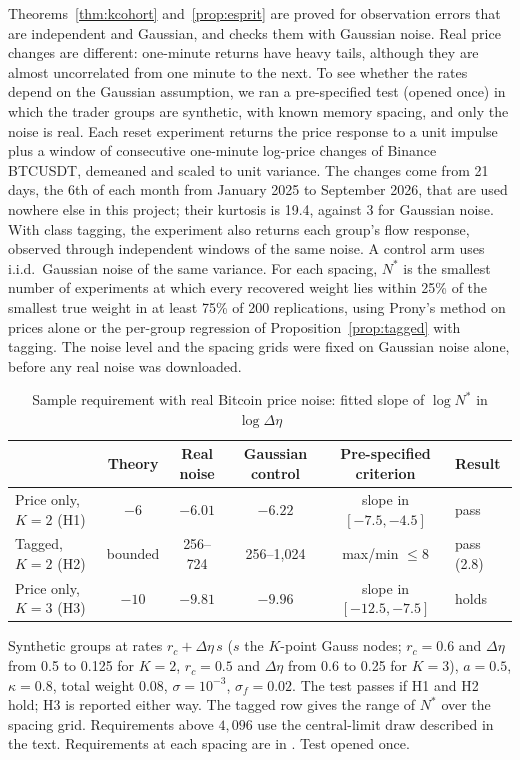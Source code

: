 \documentclass[12pt]{article}
\theoremstyle{definition}
\theoremstyle{remark}
\begin{document}
Theorems~\ref{thm:kcohort} and~\ref{prop:esprit} are proved for observation errors that are independent and Gaussian, and \citet{niroula2026a} checks them with Gaussian noise. Real price changes are different: one-minute returns have heavy tails, although they are almost uncorrelated from one minute to the next. To see whether the rates depend on the Gaussian assumption, we ran a pre-specified test (opened once) in which the trader groups are synthetic, with known memory spacing, and only the noise is real. Each reset experiment returns the price response to a unit impulse plus a window of consecutive one-minute log-price changes of Binance BTCUSDT, demeaned and scaled to unit variance. The changes come from 21 days, the 6th of each month from January 2025 to September 2026, that are used nowhere else in this project; their kurtosis is 19.4, against 3 for Gaussian noise. With class tagging, the experiment also returns each group's flow response, observed through independent windows of the same noise. A control arm uses i.i.d.\ Gaussian noise of the same variance. For each spacing, $N^*$ is the smallest number of experiments at which every recovered weight lies within 25\% of the smallest true weight in at least 75\% of 200 replications, using Prony's method on prices alone or the per-group regression of Proposition~\ref{prop:tagged} with tagging. The noise level and the spacing grids were fixed on Gaussian noise alone, before any real noise was downloaded.

\begin{table}[t]\centering\small
\begin{threeparttable}
\caption{Sample requirement with real Bitcoin price noise: fitted slope of $\log N^*$ in $\log\Delta\eta$}\label{tab:injection}
\begin{tabular}{lccccl}
\toprule
 & Theory & Real noise & Gaussian control & Pre-specified criterion & Result\\
\midrule
Price only, $K=2$ (H1) & $-6$ & $-6.01$ & $-6.22$ & slope in $[-7.5,-4.5]$ & pass\\
Tagged, $K=2$ (H2) & bounded & 256--724 & 256--1{,}024 & max/min $\le8$ & pass (2.8)\\
Price only, $K=3$ (H3) & $-10$ & $-9.81$ & $-9.96$ & slope in $[-12.5,-7.5]$ & holds\\
\bottomrule
\end{tabular}
\begin{tablenotes}\footnotesize\item Synthetic groups at rates $r_c+\Delta\eta\,s$ ($s$ the $K$-point Gauss nodes; $r_c=0.6$ and $\Delta\eta$ from 0.5 to 0.125 for $K=2$, $r_c=0.5$ and $\Delta\eta$ from 0.6 to 0.25 for $K=3$), $a=0.5$, $\kappa=0.8$, total weight 0.08, $\sigma=10^{-3}$, $\sigma_f=0.02$. The test passes if H1 and H2 hold; H3 is reported either way. The tagged row gives the range of $N^*$ over the spacing grid. Requirements above $4{,}096$ use the central-limit draw described in the text. Requirements at each spacing are in \citet{niroula2026a}. Test opened once.\end{tablenotes}
\end{threeparttable}
\end{table}
\end{document}
